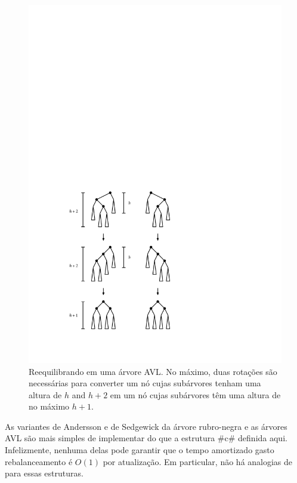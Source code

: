 \begin{figure}
	\begin{center}
		\includegraphics[scale=0.90909]{figs/avl-rebalance}
	\end{center}
	\caption{Reequilibrando em uma árvore AVL. No máximo, duas rotações são necessárias
		para converter um nó cujas subárvores tenham uma altura de $h$ and $h+2$ em um nó
		cujas subárvores têm uma altura de no máximo $h+1$.}
\end{figure}

As variantes de Andersson e de Sedgewick da árvore rubro-negra e as árvores AVL 
são mais simples de implementar do que a estrutura #c# 
definida aqui. Infelizmente, nenhuma delas pode garantir que o tempo amortizado 
gasto rebalanceamento é $O(1)$ por atualização. Em particular, não há analogias
de  para essas estruturas.

